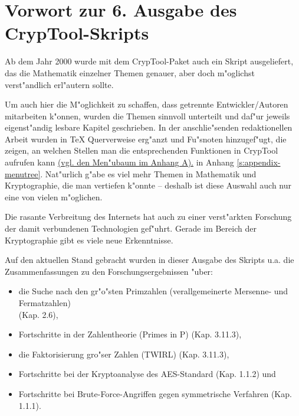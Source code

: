 

\section*{Vorwort zur 6. Ausgabe des CrypTool-Skripts}  

Ab dem Jahr 2000 wurde mit dem CrypTool-Paket auch ein Skript 
ausgeliefert, das die Mathematik einzelner Themen genauer, aber doch 
m"oglichst verst"andlich erl"autern sollte.

Um auch hier die M"oglichkeit zu schaffen, dass getrennte Entwickler/Autoren
mitarbeiten k"onnen, wurden die Themen sinnvoll unterteilt und daf"ur jeweils
eigenst"andig lesbare Kapitel geschrieben. In der anschlie"senden redaktionellen
Arbeit wurden in TeX Querverweise erg"anzt und Fu"snoten hinzugef"ugt, die
zeigen, an welchen Stellen man die entsprechenden Funktionen in
CrypTool aufrufen kann 
\hyperlink{appendix-menutree}{(vgl. den Men"ubaum im Anhang A).}
in Anhang \ref{s:appendix-menutree}.
Nat"urlich g"abe es viel mehr Themen in Mathematik und Kryptographie, die
man vertiefen k"onnte -- deshalb ist diese Auswahl auch nur eine von
vielen m"oglichen.

Die rasante Verbreitung des Internets hat auch zu einer verst"arkten 
Forschung der damit verbundenen Technologien gef"uhrt. Gerade im Bereich 
der Kryptographie gibt es viele neue Erkenntnisse.

Auf den aktuellen Stand gebracht wurden in dieser Ausgabe 
des Skripts u.a. die Zusammenfassungen zu den Forschungsergebnissen "uber:                   
\vspace{-7pt}
\begin{itemize}
  \item die Suche nach den gr"o"sten Primzahlen (verallgemeinerte
        Mersenne- und Fermatzahlen) \\ (Kap. 2.6),
  \item Fortschritte in der Zahlentheorie (\glqq Primes in P\grqq) (Kap. 3.11.3),
  \item die Faktorisierung gro"ser Zahlen (TWIRL) (Kap. 3.11.3),
  \item Fortschritte bei der Kryptoanalyse des AES-Standard (Kap. 1.1.2) und
  \item Fortschritte bei Brute-Force-Angriffen gegen symmetrische Verfahren
	(Kap. 1.1.1).
\end{itemize}

